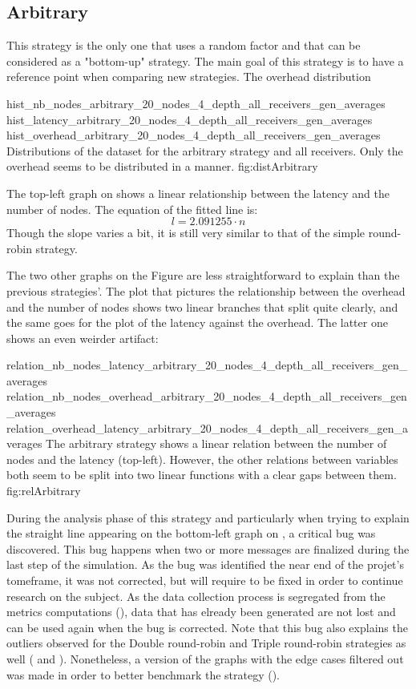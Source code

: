 \FloatBarrier
\subsection{Arbitrary}
\label{ssec:arbitrary}
This strategy is the only one that uses a random factor and that can be
considered as a "bottom-up" strategy. The main goal of this strategy is to
have a reference point when comparing new strategies.
The overhead distribution 

\triplefigure
    {hist_nb_nodes_arbitrary_20_nodes_4_depth_all_receivers_gen_averages}
    {hist_latency_arbitrary_20_nodes_4_depth_all_receivers_gen_averages}
    {hist_overhead_arbitrary_20_nodes_4_depth_all_receivers_gen_averages}
    {Distributions of the dataset for the arbitrary strategy and all
    receivers. Only the overhead seems to be distributed in a  manner. }
    {fig:distArbitrary}

The top-left graph on  shows a linear relationship
between the latency and the number of nodes. The equation of the fitted line is:
\[l = 2.091255 \cdot n\]
Though the slope varies a bit, it is still very similar to that of the simple
round-robin strategy.

The two other graphs on the Figure are less straightforward to explain than the
previous strategies'. The plot that pictures the relationship between the
overhead and the number of nodes shows two linear branches that split quite
clearly, and the same goes for the plot of the latency against the overhead.
The latter one shows an even weirder artifact: 

\triplefigure
    {relation_nb_nodes_latency_arbitrary_20_nodes_4_depth_all_receivers_gen_averages}
    {relation_nb_nodes_overhead_arbitrary_20_nodes_4_depth_all_receivers_gen_averages}
    {relation_overhead_latency_arbitrary_20_nodes_4_depth_all_receivers_gen_averages}
    {The arbitrary strategy shows a linear relation between the number of
    nodes and the latency (top-left). However, the other relations between
    variables both seem to be split into two linear functions with a clear gaps
    between them.}
    {fig:relArbitrary}

During the analysis phase of this strategy and particularly when trying to
explain the straight line appearing on the bottom-left graph on
, a critical bug was discovered. This bug happens when two
or more messages are finalized during the last step of the simulation. As the
bug was identified the near end of the projet's tomeframe, it was not corrected,
but will require to be fixed in order to continue research on the subject. As
the data collection process is segregated from the metrics computations
(), data that has elready been generated are not
lost and can be used again when the bug is corrected. Note that this bug also
explains the outliers observed for the Double round-robin and Triple round-robin
strategies as well ( and ).
Nonetheless, a version of the graphs with the edge cases filtered out was made
in order to better benchmark the strategy ().

